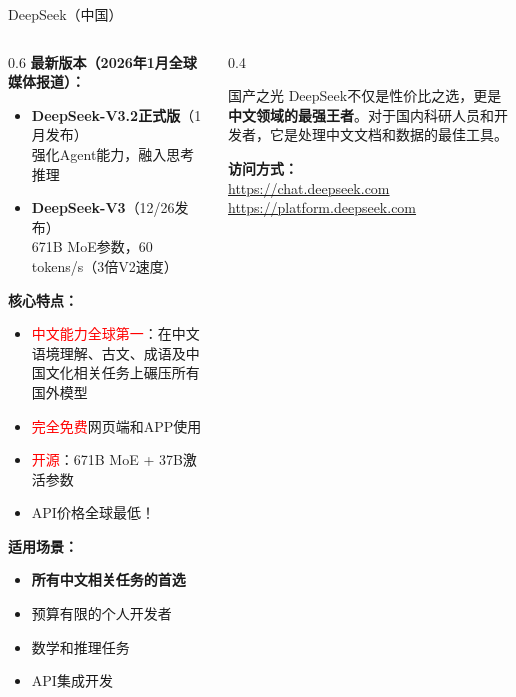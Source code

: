 \documentclass[aspectratio=169,11pt]{beamer}
\begin{document}
\begin{frame}{DeepSeek（中国）}
    \begin{columns}
        \begin{column}{0.6\textwidth}
            \textbf{最新版本（2026年1月全球媒体报道）：}
            \begin{itemize}
                \item \textbf{DeepSeek-V3.2正式版}（1月发布）\\
                    {\small 强化Agent能力，融入思考推理}
                \item \textbf{DeepSeek-V3}（12/26发布）\\
                    {\small 671B MoE参数，60 tokens/s（3倍V2速度）}
            \end{itemize}
            
            \vspace{0.3cm}
            \textbf{核心特点：}
            \begin{itemize}
                \item \textcolor{red}{中文能力全球第一}：在中文语境理解、古文、成语及中国文化相关任务上碾压所有国外模型
                \item \textcolor{red}{完全免费}网页端和APP使用
                \item \textcolor{red}{开源}：671B MoE + 37B激活参数
                \item API价格全球最低！
            \end{itemize}
            
            \vspace{0.3cm}
            \textbf{适用场景：}
            \begin{itemize}
                \item \textbf{所有中文相关任务的首选}
                \item 预算有限的个人开发者
                \item 数学和推理任务
                \item API集成开发
            \end{itemize}
        \end{column}
        \begin{column}{0.4\textwidth}
            \begin{alertblock}{国产之光}
                DeepSeek不仅是性价比之选，更是\textbf{中文领域的最强王者}。对于国内科研人员和开发者，它是处理中文文档和数据的最佳工具。
            \end{alertblock}
            
            \vspace{0.2cm}
            \textbf{访问方式：}\\
            \url{https://chat.deepseek.com}\\
            \url{https://platform.deepseek.com}
        \end{column}
    \end{columns}
\end{frame}
\end{document}
